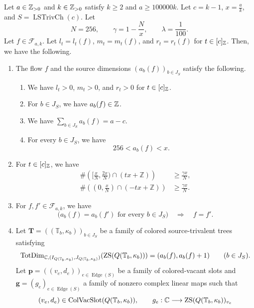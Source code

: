 \begin{lemma}\label{lem:flow-choices}
Let $a\in\mathbb Z_{>0}$ and $k\in\mathbb Z_{>0}$ satisfy $k\ge2$ and $a\ge100000k$.
Let $c=k-1$, $x=\frac ak$, and $S=\operatorname{LSTrivCh}(c)$.
Let
\[
 N=256,\qquad \gamma=1-\frac Nx,\qquad \lambda=\frac1{100}.
\]
Let $f\in\mathcal F_{a,k}$.
Let $l_t=l_t(f)$, $m_t=m_t(f)$, and $r_t=r_t(f)$ for $t\in[c]_{\mathbb Z}$.
Then, we have the following.

\begin{enumerate}
\item\label{c:flow-choices-dimensions} The flow $f$ and the source dimensions $(a_b(f))_{b\in J_{S}}$ satisfy the following.
\begin{enumerate}[label=(\alph*),ref=\theenumi(\alph*)]
\item\label{c:flow-choices-positive} We have $l_t>0$, $m_t>0$, and $r_t>0$ for $t\in[c]_{\mathbb Z}$.
\item\label{c:flow-choices-integral} For $b\in J_S$, we have $a_b(f)\in\mathbb Z$.
\item\label{c:flow-choices-sum} We have $\sum_{b\in J_S}a_b(f)=a-c$.
\item\label{c:flow-choices-range} For every $b\in J_S$, we have
\[
 256<a_b(f)<x.
\]
\end{enumerate}
\item\label{c:flow-choices-count} For $t\in[c]_{\mathbb Z}$, we have
\[
\begin{aligned}
 \#\left([\frac{x}{N},\frac{2x}{N})\cap(tx+\mathbb Z)\right)&\ge\frac{\gamma x}{N},\\
 \#\left((0,\frac{x}{N})\cap(-tx+\mathbb Z)\right)&\ge\frac{\gamma x}{N}.
\end{aligned}
\]
\item\label{c:flow-choices-distinct} For $f,f'\in\mathcal F_{a,k}$, we have
\[
 \bigl(a_b(f)=a_b(f')\text{ for every }b\in J_S\bigr)
 \quad\Longrightarrow\quad f=f'.
\]
\item\label{c:flow-choices-stable} Let $\mathbf T=((\mathbb T_b,\kappa_b))_{b\in J_S}$ be a family of colored source-trivalent trees satisfying
\[
 \operatorname{TotDim}_{\mathbb C,(I_{Q(\mathbb T_b,\kappa_b)},J_{Q(\mathbb T_b,\kappa_b)})}
 (\operatorname{ZS}(Q(\mathbb T_b,\kappa_b)))=(a_b(f),a_b(f)+1)
 \qquad(b\in J_S).
\]
Let $\mathbf p=((v_e,d_e))_{e\in\operatorname{Edge}(S)}$ be a family of colored-vacant slots and $\mathbf g=(g_e)_{e\in\operatorname{Edge}(S)}$ a family of nonzero complex linear maps such that
\[
 (v_e,d_e)\in\operatorname{ColVacSlot}(Q(\mathbb T_b,\kappa_b)),\qquad
 g_e:\mathbb C\longrightarrow\operatorname{ZS}(Q(\mathbb T_b,\kappa_b))_{v_e}
\]
\end{enumerate}
\end{lemma}
